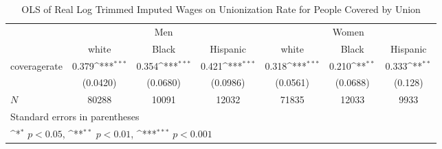 \begin{table}[htbp]\centering
\def\sym#1{\ifmmode^{#1}\else\(^{#1}\)\fi}
\caption{OLS of Real Log Trimmed Imputed Wages on Unionization Rate for People Covered by Union}
\begin{tabular}{l*{6}{c}}
\hline\hline
            &\multicolumn{3}{c}{Men}                                          &\multicolumn{3}{c}{Women}                                        \\\cmidrule(lr){2-4}\cmidrule(lr){5-7}
            &\multicolumn{1}{c}{white}&\multicolumn{1}{c}{Black}&\multicolumn{1}{c}{Hispanic}&\multicolumn{1}{c}{white}&\multicolumn{1}{c}{Black}&\multicolumn{1}{c}{Hispanic}\\
\hline
coveragerate&       0.379\sym{***}&       0.354\sym{***}&       0.421\sym{***}&       0.318\sym{***}&       0.210\sym{**} &       0.333\sym{**} \\
            &    (0.0420)         &    (0.0680)         &    (0.0986)         &    (0.0561)         &    (0.0688)         &     (0.128)         \\
\hline
\(N\)       &       80288         &       10091         &       12032         &       71835         &       12033         &        9933         \\
\hline\hline
\multicolumn{7}{l}{\footnotesize Standard errors in parentheses}\\
\multicolumn{7}{l}{\footnotesize \sym{*} \(p<0.05\), \sym{**} \(p<0.01\), \sym{***} \(p<0.001\)}\\
\end{tabular}
\end{table}
